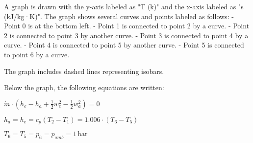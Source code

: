 A graph is drawn with the y-axis labeled as "T (k)" and the x-axis labeled as "s (kJ/kg·K)". The graph shows several curves and points labeled as follows:  
- Point 0 is at the bottom left.  
- Point 1 is connected to point 2 by a curve.  
- Point 2 is connected to point 3 by another curve.  
- Point 3 is connected to point 4 by a curve.  
- Point 4 is connected to point 5 by another curve.  
- Point 5 is connected to point 6 by a curve.  

The graph includes dashed lines representing isobars.  

Below the graph, the following equations are written:  

\( \dot{m} \cdot (h_e - h_a + \frac{1}{2} w_e^2 - \frac{1}{2} w_a^2) = 0 \)  

\( h_a = h_e = c_p (T_2 - T_1) = 1.006 \cdot (T_6 - T_5) \)  

\( T_6 = T_5 = p_6 = p_{amb} = 1 \, \text{bar} \)